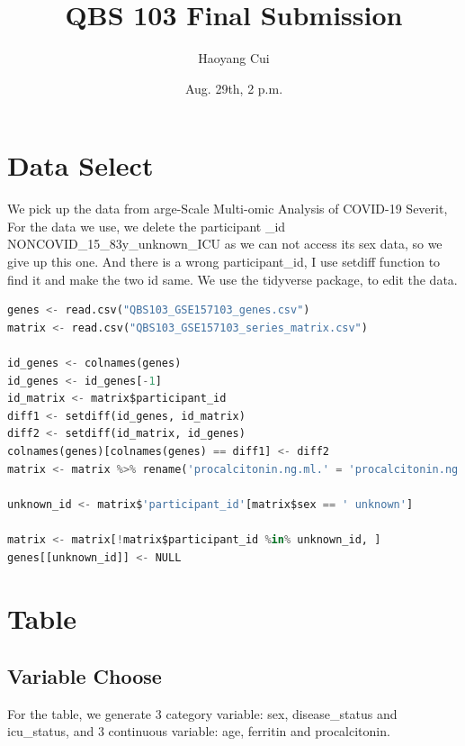 \documentclass[a4paper, 12pt, one column]{article}
\title{QBS 103 Final Submission}
\author{Haoyang Cui}
\date{Aug. 29th, 2 p.m.}
\begin{document}
\maketitle

\section{Data Select}
We pick up the data from arge-Scale Multi-omic Analysis of COVID-19
Severit, \cite{Overmyer2021}\\
For the data we use, we delete the participant \_id NONCOVID\_15\_83y\_unknown\_ICU as we can not access its sex data, so we give up this one. And there is a wrong participant\_id, I use setdiff function to find it and make the two id same. We use the tidyverse package, \cite{tidyverse_2023} to edit the data.\\
\begin{lstlisting}[language=Python]
genes <- read.csv("QBS103_GSE157103_genes.csv")
matrix <- read.csv("QBS103_GSE157103_series_matrix.csv")

id_genes <- colnames(genes)
id_genes <- id_genes[-1]
id_matrix <- matrix$participant_id
diff1 <- setdiff(id_genes, id_matrix)
diff2 <- setdiff(id_matrix, id_genes)
colnames(genes)[colnames(genes) == diff1] <- diff2
matrix <- matrix %>% rename('procalcitonin.ng.ml.' = 'procalcitonin.ng.ml..')

unknown_id <- matrix$'participant_id'[matrix$sex == ' unknown']

matrix <- matrix[!matrix$participant_id %in% unknown_id, ]
genes[[unknown_id]] <- NULL
\end{lstlisting}
\section{Table}
\subsection{Variable Choose}
For the table, we generate 3 category variable: sex, disease\_status and icu\_status, and 3 continuous variable: age, ferritin and procalcitonin.
\end{document}
